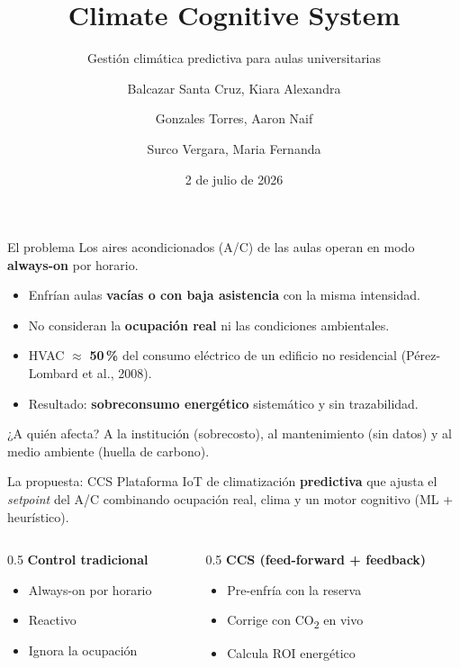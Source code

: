 \documentclass[aspectratio=169,11pt]{beamer}
\title[Climate Cognitive System]{Climate Cognitive System}
\subtitle{Gestión climática predictiva para aulas universitarias}
\author[Grupo CCS]{Balcazar Santa Cruz, Kiara Alexandra \and Gonzales Torres, Aaron Naif \and Surco Vergara, Maria Fernanda}
\institute[UTEC]{Computación Cognitiva --- UTEC, Barranco (Lima)\\ \footnotesize Docente: Farfán Madariaga, Jaime Moshe}
\date{2 de julio de 2026}
\begin{document}
\begin{frame}[plain]
  \titlepage
\end{frame}

\begin{frame}{El problema}
  Los aires acondicionados (A/C) de las aulas operan en modo \textbf{always-on} por horario.
  \begin{itemize}
    \item Enfrían aulas \textbf{vacías o con baja asistencia} con la misma intensidad.
    \item No consideran la \textbf{ocupación real} ni las condiciones ambientales.
    \item HVAC $\approx$ \textbf{50\,\%} del consumo eléctrico de un edificio
      no residencial (Pérez-Lombard et al., 2008).
    \item Resultado: \textbf{sobreconsumo energético} sistemático y sin trazabilidad.
  \end{itemize}
  \vfill
  \begin{block}{¿A quién afecta?}
    A la institución (sobrecosto), al mantenimiento (sin datos) y al medio ambiente
    (huella de carbono).
  \end{block}
\end{frame}

\begin{frame}{La propuesta: CCS}
  Plataforma IoT de climatización \textbf{predictiva} que ajusta el \emph{setpoint}
  del A/C combinando ocupación real, clima y un motor cognitivo (ML + heurístico).
  \begin{columns}[T]
    \begin{column}{0.5\textwidth}
      \textbf{Control tradicional}
      \begin{itemize}
        \item Always-on por horario
        \item Reactivo
        \item Ignora la ocupación
      \end{itemize}
    \end{column}
    \begin{column}{0.5\textwidth}
      \textbf{CCS (feed-forward + feedback)}
      \begin{itemize}
        \item Pre-enfría con la reserva
        \item Corrige con CO\textsubscript{2} en vivo
        \item Calcula ROI energético
      \end{itemize}
    \end{column}
  \end{columns}
\end{frame}
\end{document}
